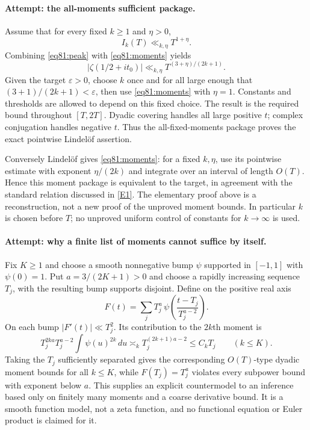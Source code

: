 \documentclass[11pt,a4paper]{article}
\numberwithin{equation}{section}
\newcommand{\eref}[2]{\hyperlink{extra:#1:#2}{[E#2]}}
\begin{document}
\paragraph{Attempt: the all-moments sufficient package.}
Assume that for every fixed $k\geq1$ and $\eta>0$,
\begin{equation}\label{eq81:moments}
 I_k(T)\ll_{k,\eta}T^{1+\eta}.
\end{equation}
Combining \eqref{eq81:peak} with \eqref{eq81:moments} yields
\[
 |\zeta(1/2+it_0)|\ll_{k,\eta}T^{(3+\eta)/(2k+1)}.
\]
Given the target $\varepsilon>0$, choose $k$ once and for all large enough
that $(3+1)/(2k+1)<\varepsilon$, then use \eqref{eq81:moments} with
$\eta=1$. Constants and thresholds are allowed to depend on this fixed
choice. The result is the required bound throughout $[T,2T]$.
Dyadic covering handles all large positive $t$; complex conjugation handles
negative $t$. Thus the all-fixed-moments package proves the exact pointwise
Lindel\"of assertion.

Conversely Lindel\"of gives \eqref{eq81:moments}: for a fixed $k,\eta$,
use its pointwise estimate with exponent $\eta/(2k)$ and integrate over
an interval of length $O(T)$. Hence this moment package is equivalent to
the target, in agreement with the standard relation discussed in
\eref{1274}{1}. The elementary proof above is a reconstruction, not a new
proof of the unproved moment bounds. In particular $k$ is chosen before
$T$; no unproved uniform control of constants for $k\to\infty$ is used.

\paragraph{Attempt: why a finite list of moments cannot suffice by itself.}
Fix $K\geq1$ and choose a smooth nonnegative bump $\psi$ supported in
$[-1,1]$ with $\psi(0)=1$. Put $a=3/(2K+1)>0$ and choose a rapidly
increasing sequence $T_j$, with the resulting bump supports disjoint.
Define on the positive real axis
\[
 F(t)=\sum_j T_j^a\,
       \psi\left(\frac{t-T_j}{T_j^{a-2}}\right).
\]
On each bump $|F'(t)|\ll T_j^2$. Its contribution to the $2k$th moment is
\[
 T_j^{2ka}T_j^{a-2}\int\psi(u)^{2k}\,du
       \asymp_k T_j^{(2k+1)a-2}\leq C_kT_j
          \qquad(k\leq K).
\]
Taking the $T_j$ sufficiently separated gives the corresponding
$O(T)$-type dyadic moment bounds for all $k\leq K$, while
$F(T_j)=T_j^a$ violates every subpower bound with exponent below $a$.
This supplies an explicit countermodel to an inference based only on
finitely many moments and a coarse derivative bound. It is a smooth
function model, not a zeta function, and no functional equation or Euler
product is claimed for it.
\end{document}
